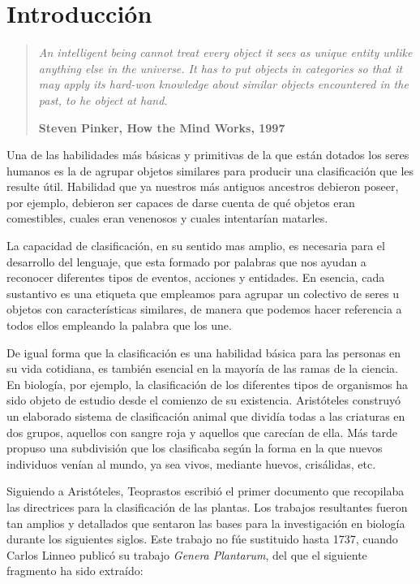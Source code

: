
\chapter{Introducción}\label{ch:introduccion}

\begin{quotation}{\slshape
		An intelligent being cannot treat every object it sees as unique entity unlike anything else in the universe. It has to put objects in categories so that it may apply its hard-won knowledge about similar objects encountered in the past, to he object at hand.}
		\begin{flushright}
			\textbf{Steven Pinker, How the Mind Works, 1997} 
		\end{flushright}
\end{quotation}

Una de las habilidades más básicas y primitivas de la que están dotados los seres humanos es la de agrupar objetos similares para producir una clasificación que les resulte útil. Habilidad que ya nuestros más antiguos ancestros debieron poseer, por ejemplo, debieron ser capaces de darse cuenta de qué objetos eran comestibles, cuales eran venenosos y cuales intentarían matarles.

La capacidad de clasificación, en su sentido mas amplio, es necesaria para el desarrollo del lenguaje, que esta formado por palabras que nos ayudan a reconocer diferentes tipos de eventos, acciones y entidades. En esencia, cada sustantivo es una etiqueta que empleamos para agrupar un colectivo de seres u objetos con características similares, de manera que podemos hacer referencia a todos ellos empleando la palabra que los une.

De igual forma que la clasificación es una habilidad básica para las personas en su vida cotidiana, es también esencial en la mayoría de las ramas de la ciencia. En biología, por ejemplo, la clasificación de los diferentes tipos de organismos ha sido objeto de estudio desde el comienzo de su existencia. Aristóteles construyó un elaborado sistema de clasificación animal que dividía todas a las criaturas en dos grupos, aquellos con sangre roja y aquellos que carecían de ella. Más tarde propuso una subdivisión que los clasificaba según la forma en la que nuevos individuos venían al mundo, ya sea vivos, mediante huevos, crisálidas, etc.

Siguiendo a Aristóteles, Teoprastos escribió el primer documento que recopilaba las directrices para la clasificación de las plantas. Los trabajos resultantes fueron tan amplios y detallados que sentaron las bases para la investigación en biología durante los siguientes siglos. Este trabajo no fúe sustituido hasta 1737, cuando Carlos Linneo publicó su trabajo \textit{Genera Plantarum}, del que el siguiente fragmento ha sido extraído:

